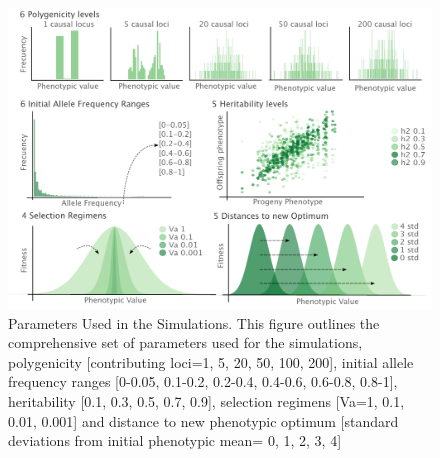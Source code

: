 \documentclass{article}
\begin{document}
\begin{figure}[b]
    \centering
    \includegraphics[width=1\textwidth]{figures/parameters.pdf}
    \caption{Parameters Used in the Simulations. This figure outlines the comprehensive set of parameters used for the simulations, polygenicity [contributing loci=1, 5, 20, 50, 100, 200], initial allele frequency ranges [0-0.05, 0.1-0.2, 0.2-0.4, 0.4-0.6, 0.6-0.8, 0.8-1], heritability [0.1, 0.3, 0.5, 0.7, 0.9], selection regimens  [Va=1, 0.1, 0.01, 0.001] and distance to new phenotypic optimum [standard deviations from initial phenotypic mean= 0, 1, 2, 3, 4]}
    \label{fig:parameters}
\end{figure}
\end{document}
